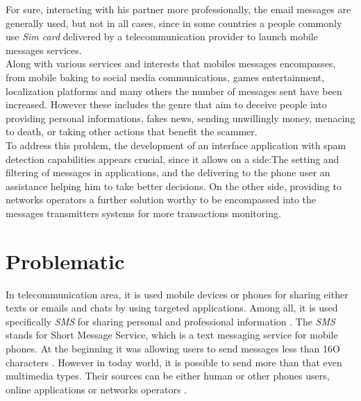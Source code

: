 \documentclass[12pt,a4paper, oneside]{book}
\begin{document}
	For sure, interacting with his partner more professionally, the email messages are generally used, but not in all cases, since in some countries a  people commonly use \textit{Sim card} delivered by a telecommunication provider to launch mobile messages services.\\
	
	Along with various services and interests that mobiles messages encompasses, from mobile baking to social media communications, games entertainment, localization platforms and many others the number of messages sent have been increased. However these includes the genre that aim to deceive people into providing personal informations, fakes news, sending unwillingly money, menacing to death, or taking other actions that benefit the scammer.\\
		
	To address this problem, the development of an interface application with spam detection capabilities appears crucial, since it allows on a side:The setting and filtering of messages in applications, and the delivering to the phone user an assistance helping him to take better decisions. On the other side, providing to networks operators a further solution worthy to be encompassed into the messages transmitters systems for more transactions monitoring.
	 
	\section{Problematic} 
	In telecommunication area, it is used mobile devices or phones for sharing either texts or emails and chats by using targeted applications. Among all, it is used specifically \textit{SMS} for sharing personal and professional information  \citep{lavanya2582sms}. The \textit{SMS} stands for Short Message Service, which is a text messaging service for mobile phones. At the beginning it was allowing users to send messages  less than 16O characters \citep{le2005mobile}. However in today world, it is possible to send more than that even multimedia types. Their sources can be either human or other phones users, online applications or networks operators \citep{jangir2016design}.\\
		
\end{document}
